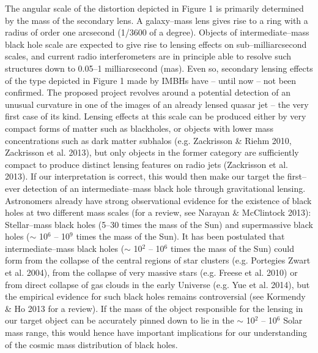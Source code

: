 \documentclass[a4paper, 11pt]{article}
\begin{document}
The angular scale of the distortion depicted in Figure 1 is primarily determined by the mass of the secondary lens. A galaxy--mass lens gives rise to a ring with a radius of order one arcsecond (1/3600 of a degree). Objects of intermediate--mass black hole scale are expected to give rise to lensing effects on sub--milliarcsecond scales, and current radio interferometers are in principle able to resolve such structures down to 0.05--1 milliarcsecond (mas). Even so, secondary lensing effects of the type depicted in Figure 1 made by IMBHs have -- until now -- not been confirmed. The proposed project revolves around a potential detection of an unusual curvature in one of the images of an already lensed quasar jet -- the very first case of its kind. Lensing effects at this scale can be produced either by very compact forms of matter such as blackholes, or objects with lower mass concentrations such as dark matter subhalos (e.g. Zackrisson \& Riehm 2010, Zackrisson et al. 2013), but only objects in the former category are sufficiently compact to produce distinct lensing features on radio jets (Zackrisson et al. 2013). If our interpretation is correct, this would then make our target the first--ever detection of an intermediate--mass black hole through gravitational lensing. Astronomers already have strong observational evidence for the existence of black holes at two different mass scales (for a review, see Narayan \& McClintock 2013): Stellar--mass black holes (5--30 times the mass of the Sun) and supermassive black holes ($\sim$ 10$^6$ -- 10$^9$ times the mass of the Sun). It has been postulated that intermediate--mass black holes ($\sim$ 10$^2$ -- 10$^6$ times the mass of the Sun) could form from the collapse of the central regions of star clusters (e.g. Portegies Zwart et al. 2004), from the collapse of very massive stars (e.g. Freese et al. 2010) or from direct collapse of gas clouds in the early Universe (e.g. Yue et al. 2014), but the empirical evidence for such black holes remains controversial (see Kormendy \& Ho 2013 for a review). If the mass of the object responsible for the lensing in our target object can be accurately pinned down to lie in the $\sim$ 10$^2$ -- 10$^6$ Solar mass range, this would hence have important implications for our understanding of the cosmic mass distribution of black holes.
\end{document}
